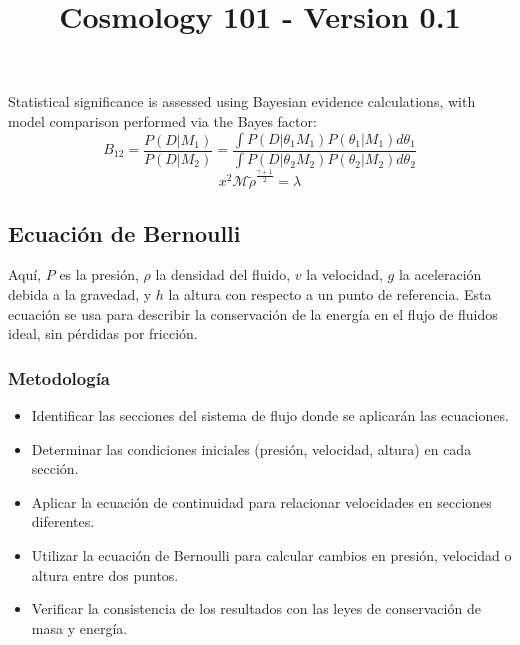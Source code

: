 \documentclass{article}\usepackage{graphicx} \usepackage{amsmath} \usepackage{colortbl}\title{Cosmology 101 - Version 0.1}
\begin{document}
Statistical significance is assessed using Bayesian evidence calculations, with model comparison performed via the Bayes factor:  \begin{equation} B_{12} = \frac{P(D|M_1)}{P(D|M_2)} = \frac{\int P(D|\theta_1 M_1)P(\theta_1|M_1)d\theta_1}{\int P(D|\theta_2 M_2)P(\theta_2|M_2)d\theta_2} 
\end{equation} \begin{equation}x^2 \mathcal{M} \tilde{\rho }^{\frac{\gamma +1}{2}}=\lambda \label{ber1} \end{equation}\subsection{Ecuaci{\'o}n de Bernoulli}
Aquí, $P$ es la presión, $\rho$ la densidad del fluido, $v$ la velocidad, $g$ la aceleración debida a la gravedad, y $h$ la altura con respecto a un punto de referencia. Esta ecuaci{\'o}n se usa para describir la conservación de la energía en el flujo de fluidos ideal, sin pérdidas por fricción.
\subsubsection{Metodolog{\'i}a}
\begin{itemize}
\item Identificar las secciones del sistema de flujo donde se aplicarán las ecuaciones.
\item Determinar las condiciones iniciales (presión, velocidad, altura) en cada sección.
\item Aplicar la ecuación de continuidad para relacionar velocidades en secciones diferentes.
\item Utilizar la ecuación de Bernoulli para calcular cambios en presión, velocidad o altura entre dos puntos.
\item Verificar la consistencia de los resultados con las leyes de conservación de masa y energía.
\end{itemize}
\end{document}
